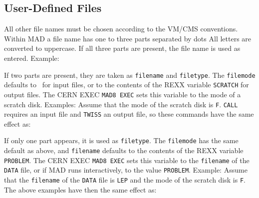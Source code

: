 \subsection{User-Defined Files}
All other file names must be chosen according to the VM/CMS conventions.
Within MAD a file name has one to three parts separated by dots
All letters are converted to uppercase.
If all three parts are present, the file name is used as entered.
Example:
\par If two parts are present,
they are taken as {\tt filename} and {\tt filetype}.
The {\tt filemode} defaults to~{\tt *} for input files,
or to the contents of the REXX variable {\tt SCRATCH}
for output files.
The CERN EXEC {\tt MAD8 EXEC} sets this variable to the mode of
a scratch disk.
Examples:
Assume that the mode of the scratch disk is {\tt F}.
{\tt CALL} requires an input file and {\tt TWISS} an output file,
so these commands have the same effect as:
\par If only one part appears, it is used as {\tt filetype}.
The {\tt filemode} has the same default as above, and {\tt filename}
defaults to the contents of the REXX variable {\tt PROBLEM}.
The CERN EXEC {\tt MAD8 EXEC} sets this variable to the {\tt filename}
of the {\tt DATA} file, or if MAD runs interactively,
to the value {\tt PROBLEM}.
Example:
Assume that the {\tt filename} of the {\tt DATA} file is {\tt LEP}
and the mode of the scratch disk is {\tt F}.
The above examples have then the same effect as:

